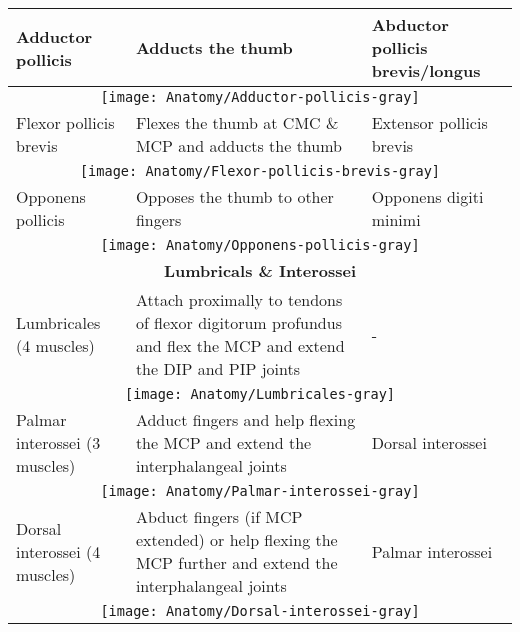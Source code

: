 \documentclass[main]{subfiles}
\begin{document}
\begin{longtable}{p{3.2cm}p{5.5cm}|l}
Adductor pollicis & Adducts the thumb & Abductor pollicis brevis/longus \\*
\hline
\multicolumn{3}{c}{\texttt{[image: Anatomy/Adductor-pollicis-gray]}}\\
\hline

Flexor pollicis brevis & Flexes the thumb at CMC \& MCP and adducts the thumb & Extensor pollicis brevis\\*
\hline
\multicolumn{3}{c}{\texttt{[image: Anatomy/Flexor-pollicis-brevis-gray]}}\\
\hline

Opponens pollicis & Opposes the thumb to other fingers & Opponens digiti minimi\\*
\hline
\multicolumn{3}{c}{\texttt{[image: Anatomy/Opponens-pollicis-gray]}}\\

\hline
\multicolumn{3}{c}{\textbf{Lumbricals \& Interossei}}\\*
\hline
Lumbricales (4 muscles) & Attach proximally to tendons of flexor digitorum profundus and flex the MCP and extend the DIP and PIP joints & - \\*
\hline
\multicolumn{3}{c}{\texttt{[image: Anatomy/Lumbricales-gray]}}\\
\hline

Palmar interossei (3 muscles) & Adduct fingers and help flexing the MCP and extend the interphalangeal joints & Dorsal interossei \\*
\hline
\multicolumn{3}{c}{\texttt{[image: Anatomy/Palmar-interossei-gray]}}\\
\hline

Dorsal interossei (4 muscles) & Abduct fingers (if MCP extended) or help flexing the MCP further and extend the interphalangeal joints & Palmar interossei \\*
\hline
\multicolumn{3}{c}{\texttt{[image: Anatomy/Dorsal-interossei-gray]}}\\
\hline
\end{longtable}
\normalsize
\end{document}
